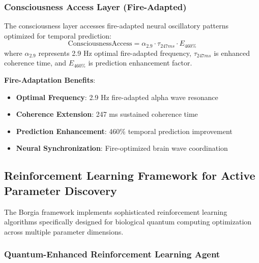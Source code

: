 ﻿\documentclass[11pt,a4paper]{article}
\begin{document}
\begin{itemize}
\begin{itemize}
\subsubsection{Consciousness Access Layer (Fire-Adapted)}

\begin{definition}
The consciousness layer accesses fire-adapted neural oscillatory patterns optimized for temporal prediction:
\begin{equation}
\text{ConsciousnessAccess} = \alpha_{2.9} \cdot \tau_{247ms} \cdot E_{460\%}
\end{equation}
where $\alpha_{2.9}$ represents 2.9 Hz optimal fire-adapted frequency, $\tau_{247ms}$ is enhanced coherence time, and $E_{460\%}$ is prediction enhancement factor.
\end{definition}

\textbf{Fire-Adaptation Benefits}:
\begin{itemize}
\item \textbf{Optimal Frequency}: 2.9 Hz fire-adapted alpha wave resonance
\item \textbf{Coherence Extension}: 247 ms sustained coherence time
\item \textbf{Prediction Enhancement}: 460\% temporal prediction improvement
\item \textbf{Neural Synchronization}: Fire-optimized brain wave coordination
\end{itemize}

\subsection{Reinforcement Learning Framework for Active Parameter Discovery}

The Borgia framework implements sophisticated reinforcement learning algorithms specifically designed for biological quantum computing optimization across multiple parameter dimensions.

\subsubsection{Quantum-Enhanced Reinforcement Learning Agent}


\end{itemize}
\end{itemize}
\end{document}
